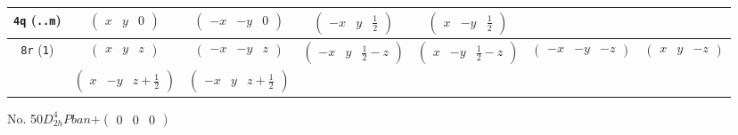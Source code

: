 \documentclass[fleqn,9pt,landscape]{jsarticle}
\begin{document}
\begin{center}
\begin{longtable}{ccccccc}
{\tt 4q} ({\tt ..m}) & $ \begin{pmatrix} x & y & 0 \end{pmatrix} $ & $ \begin{pmatrix} - x & - y & 0 \end{pmatrix} $ & $ \begin{pmatrix} - x & y & \frac{1}{2} \end{pmatrix} $ & $ \begin{pmatrix} x & - y & \frac{1}{2} \end{pmatrix} $ & $  $ & $  $ \\ \hline
{\tt 8r} ({\tt 1}) & $ \begin{pmatrix} x & y & z \end{pmatrix} $ & $ \begin{pmatrix} - x & - y & z \end{pmatrix} $ & $ \begin{pmatrix} - x & y & \frac{1}{2} - z \end{pmatrix} $ & $ \begin{pmatrix} x & - y & \frac{1}{2} - z \end{pmatrix} $ & $ \begin{pmatrix} - x & - y & - z \end{pmatrix} $ & $ \begin{pmatrix} x & y & - z \end{pmatrix} $ \\
& $ \begin{pmatrix} x & - y & z + \frac{1}{2} \end{pmatrix} $ & $ \begin{pmatrix} - x & y & z + \frac{1}{2} \end{pmatrix} $ & $  $ & $  $ & $  $ & $  $ \\
\end{longtable}
\end{center}
\newpage
No. 50\quad$D_{2h}^{4}$\quad$Pban$\quad[ orthorhombic ]\quad$+\begin{pmatrix} 0 & 0 & 0 \end{pmatrix}$
\end{document}
